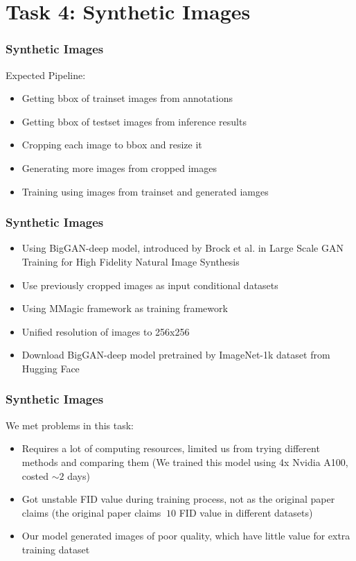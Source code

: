 \documentclass{beamer}
\begin{document}
    \section{Task 4: Synthetic Images}
        \begin{frame}
            \frametitle{Synthetic Images}
            Expected Pipeline:\par
            \begin{itemize}
                \item Getting bbox of trainset images from annotations 
                \item Getting bbox of testset images from inference results
                \item Cropping each image to bbox and resize it
                \item Generating more images from cropped images
                \item Training using images from trainset and generated iamges
            \end{itemize}
        \end{frame}
        \begin{frame}
            \frametitle{Synthetic Images}
            \begin{itemize}
                \item Using BigGAN-deep model, introduced by Brock et al. in Large Scale GAN Training for High Fidelity Natural Image Synthesis
                \item Use previously cropped images as input conditional datasets
                \item Using MMagic framework as training framework
                \item Unified resolution of images to 256x256
                \item Download BigGAN-deep model pretrained by ImageNet-1k dataset from Hugging Face
            \end{itemize}
        \end{frame}
        \begin{frame}
            \frametitle{Synthetic Images}
            We met problems in this task:\par
            \begin{itemize}
                \item Requires a lot of computing resources, limited us from trying different methods and comparing them (We trained this model using 4x Nvidia A100, costed $\sim 2$ days)
                \item Got unstable FID value during training process, not as the original paper claims (the original paper claims $~10$ FID value in different datasets)
                \item Our model generated images of poor quality, which have little value for extra training dataset
            \end{itemize}
        \end{frame}
\end{document}
